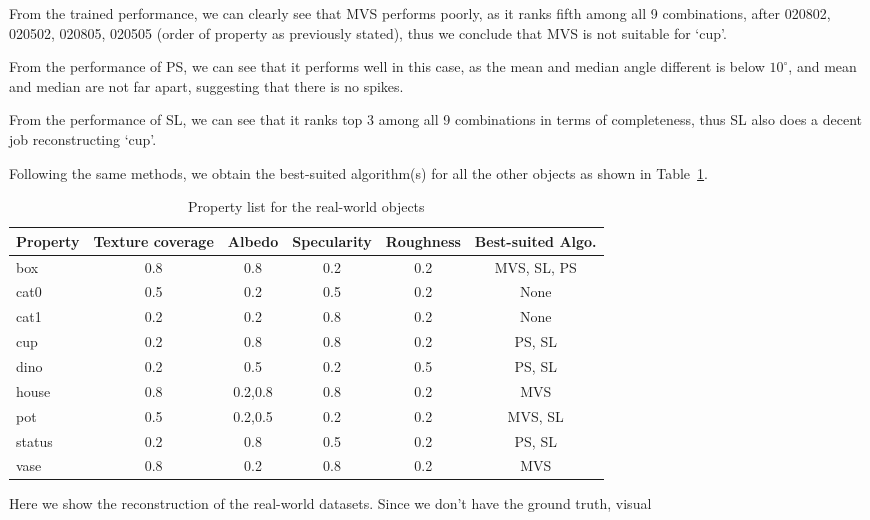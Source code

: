 From the trained performance, we can clearly see that MVS performs poorly, as it ranks fifth among all 9 combinations, after 020802, 020502, 020805, 020505 (order of property as previously stated), thus we conclude that MVS is not suitable for	`cup'.

From the performance of PS, we can see that it performs well in this case, as the mean and median angle different is below $10^\circ$, and mean and median are not far apart, suggesting that there is no spikes.

From the performance of SL, we can see that it ranks top 3 among all 9 combinations in terms of completeness, thus SL also does a decent job reconstructing `cup'.

Following the same methods, we obtain the best-suited algorithm(s) for all the other objects as shown in Table~\ref{tab:prop_list_real_data}.

\begin{table}[h]
  \centering
  \begin{tabular}{l*{5}{c}}
  \hline
  \textbf{Property} & Texture coverage & Albedo & Specularity & Roughness & Best-suited Algo.\\
  \hline
  box & 0.8 & 0.8 & 0.2 & 0.2 & MVS, SL, PS\\
  cat0 & 0.5 & 0.2 & 0.5 & 0.2 & None\\
  cat1 & 0.2 & 0.2 & 0.8 & 0.2 & None\\
  cup & 0.2 & 0.8 & 0.8 & 0.2 & PS, SL\\
  dino & 0.2 & 0.5 & 0.2 & 0.5 & PS, SL\\
  house & 0.8 & 0.2,0.8 & 0.8 & 0.2 & MVS\\
  pot & 0.5 & 0.2,0.5 & 0.2 & 0.2 & MVS, SL\\
  status & 0.2 & 0.8 & 0.5 & 0.2 & PS, SL\\
  vase & 0.8 & 0.2 & 0.8 & 0.2 & MVS\\
  \hline
  \end{tabular}
  \label{tab:prop_list_real_data}
  \caption{Property list for the real-world objects}
\end{table}

Here we show the reconstruction of the real-world datasets. Since we don't have the ground truth, visual 

